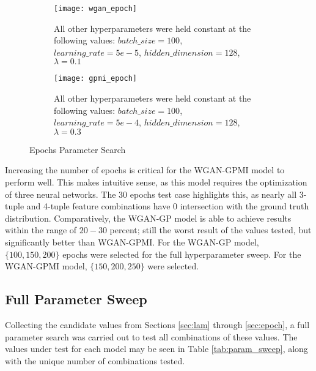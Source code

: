 \begin{figure}[!htbp]
	\centering
	\begin{subfigure}{.7\textwidth}
		\texttt{[image: wgan\_epoch]}
	\end{subfigure}%
	\begin{subfigure}{.3\textwidth}
		\caption{
			All other hyperparameters were held constant at the following values: $batch\_size = 100$, $learning\_rate=5e-5$, $hidden\_dimension=128$, $\lambda=0.1$
		}
		\label{fig:wgan_epoch}
	\end{subfigure}%

	\begin{subfigure}{.7\textwidth}
		\texttt{[image: gpmi\_epoch]}
	\end{subfigure}%
	\begin{subfigure}{.3\textwidth}
		\caption{
			All other hyperparameters were held constant at the following values: $batch\_size=100$, $learning\_rate=5e-4$, $hidden\_dimension=128$, $\lambda=0.3$
		}
		\label{fig:gpmi_epoch}
	\end{subfigure}%
	\caption{Epochs Parameter Search}
\end{figure}

Increasing the number of epochs is critical for the WGAN-GPMI model to perform well. This makes intuitive sense, as this model requires the optimization of three neural networks. The $30$ epochs test case highlights this, as nearly all 3-tuple and 4-tuple feature combinations have 0 intersection with the ground truth distribution. Comparatively, the WGAN-GP model is able to achieve results within the range of $20-30$ percent; still the worst result of the values tested, but significantly better than WGAN-GPMI. For the WGAN-GP model, $\{100,150,200\}$ epochs were selected for the full hyperparameter sweep. For the WGAN-GPMI model, $\{150, 200, 250\}$ were selected. 

\subsection{Full Parameter Sweep}

Collecting the candidate values from Sections \ref{sec:lam} through \ref{sec:epoch}, a full parameter search was carried out to test all combinations of these values. The values under test for each model may be seen in Table \ref{tab:param_sweep}, along with the unique number of combinations tested. 

